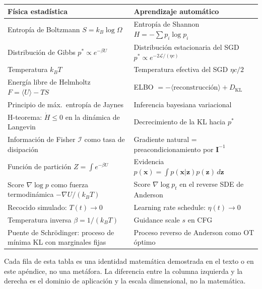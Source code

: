 \begin{center}
\begin{tabular}{p{6.2cm}p{6.2cm}}
\toprule
\textbf{Física estadística} & \textbf{Aprendizaje automático} \\
\midrule
Entropía de Boltzmann $S = k_B\log\Omega$ &
Entropía de Shannon $H = -\sum p_i\log p_i$ \\[4pt]

Distribución de Gibbs $p^*\propto e^{-\beta U}$ &
Distribución estacionaria del SGD $p^*\propto e^{-2\mathcal{L}/(\eta c)}$ \\[4pt]

Temperatura $k_BT$ &
Temperatura efectiva del SGD $\eta c/2$ \\[4pt]

Energía libre de Helmholtz $F = \langle U\rangle - TS$ &
ELBO $= -\langle\text{reconstrucción}\rangle + D_\mathrm{KL}$ \\[4pt]

Principio de máx.\ entropía de Jaynes &
Inferencia bayesiana variacional \\[4pt]

H-teorema: $\dot{H}\leq 0$ en la dinámica de Langevin &
Decrecimiento de la KL hacia $p^*$ \\[4pt]

Información de Fisher $\mathcal{I}$ como tasa de disipación &
Gradiente natural = preacondicionamiento por $\bm{I}^{-1}$ \\[4pt]

Función de partición $Z = \int e^{-\beta U}$ &
Evidencia $p(\bm{x}) = \int p(\bm{x}|\bm{z})p(\bm{z})\,d\bm{z}$ \\[4pt]

Score $\nabla\log p$ como fuerza termodinámica $-\nabla U/(k_BT)$ &
Score $\nabla\log p_t$ en el reverse SDE de Anderson \\[4pt]

Recocido simulado: $T(t)\to 0$ &
Learning rate schedule: $\eta(t)\to 0$ \\[4pt]

Temperatura inversa $\beta = 1/(k_BT)$ &
Guidance scale $s$ en CFG \\[4pt]

Puente de Schrödinger: proceso de mínima KL con marginales fijas &
Proceso reverso de Anderson como OT óptimo \\
\bottomrule
\end{tabular}
\end{center}

\medskip
Cada fila de esta tabla es una identidad matemática demostrada en el texto o
en este apéndice, no una metáfora. La diferencia entre la columna izquierda y
la derecha es el dominio de aplicación y la escala dimensional, no la matemática.

